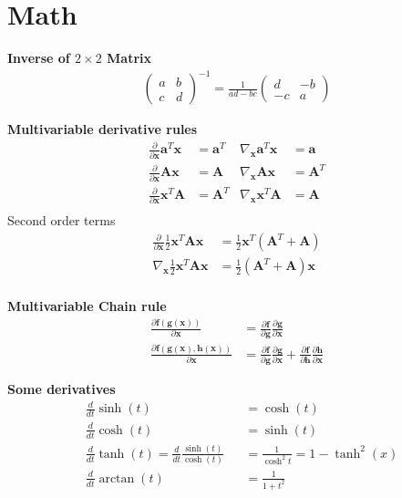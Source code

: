 \section{Math}
\textbf{Inverse of \(2\times2\) Matrix}
\begin{align*}
    \begin{pmatrix}
        a & b \\ c & d 
        \end{pmatrix}^{-1} = 
    \frac{1}{ad-bc}
    \begin{pmatrix}
        d & -b \\ -c & a 
    \end{pmatrix}
\end{align*}

\textbf{Multivariable derivative rules}
\begin{align*}
    \frac{\partial}{\partial\bm{x}} \bm{a}^T\bm{x} &=  \bm{a}^T &
    \nabla_{\bm{x}}\bm{a}^T\bm{x} &=  \bm{a} \\
    \frac{\partial}{\partial\bm{x}} \bm{Ax} &=  \bm{A} &
    \nabla_{\bm{x}}\bm{Ax} &= \bm{A}^T  \\
    \frac{\partial}{\partial\bm{x}} \bm{x}^T\bm{A} &=  \bm{A}^T &
    \nabla_{\bm{x}}\bm{x}^T\bm{A} &= \bm{A} \\
\end{align*}
Second order terms
\begin{align*}
    \frac{\partial}{\partial\bm{x}} \frac{1}{2}\bm{x}^T\bm{Ax} &=  \frac{1}{2}\bm{x}^T(\bm{A}^T+\bm{A}) \\
    \nabla_{\bm{x}} \frac{1}{2}\bm{x}^T\bm{Ax} &=  \frac{1}{2}(\bm{A}^T+\bm{A})\bm{x} \\
\end{align*}

\textbf{Multivariable Chain rule}
\begin{align*}
    \frac{\partial\bm{f}(\bm{g}(\bm{x}))}{\partial\bm{x}} &= \frac{\partial\bm{f}}{\partial\bm{g}}
    \frac{\partial\bm{g}}{\partial\bm{x}} \\
    \frac{\partial\bm{f}(\bm{g}(\bm{x}),\bm{h}(\bm{x}))}{\partial\bm{x}} &= \frac{\partial\bm{f}}{\partial\bm{g}}
     \frac{\partial\bm{g}}{\partial\bm{x}} + \frac{\partial\bm{f}}{\partial\bm{h}}\frac{\partial\bm{h}}{\partial\bm{x}}
\end{align*}

\textbf{Some derivatives}
\begin{align*}
    &\frac{d}{dt}\sinh(t) &&= \cosh(t) \\
    &\frac{d}{dt}\cosh(t) &&= \sinh(t) \\
    &\frac{d}{dt}\tanh(t) = \frac{d}{dt}\frac{\sinh(t)}{\cosh(t)} &&= \frac{1}{\cosh^2t} = 1-\tanh^2(x) \\
    &\frac{d}{dt}\arctan(t) &&= \frac{1}{1+t^2} \\
\end{align*}
